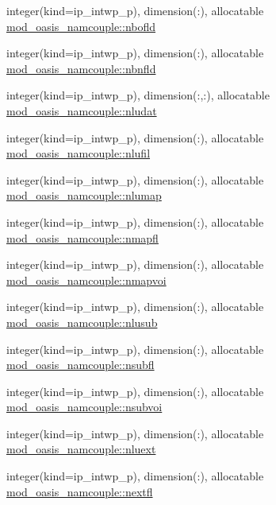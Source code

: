 \begin{DoxyCompactItemize}
\item 
integer(kind=ip\+\_\+intwp\+\_\+p), dimension(\+:), allocatable \hyperlink{namespacemod__oasis__namcouple_a21400200658d24cbf7484b5eb177c911}{mod\+\_\+oasis\+\_\+namcouple\+::nbofld}
\item 
integer(kind=ip\+\_\+intwp\+\_\+p), dimension(\+:), allocatable \hyperlink{namespacemod__oasis__namcouple_af0c7b1e7e49159c6b9c0dc3663264346}{mod\+\_\+oasis\+\_\+namcouple\+::nbnfld}
\item 
integer(kind=ip\+\_\+intwp\+\_\+p), dimension(\+:,\+:), allocatable \hyperlink{namespacemod__oasis__namcouple_abb7c2cd3a371bbb8ccd6a272d0e9b60f}{mod\+\_\+oasis\+\_\+namcouple\+::nludat}
\item 
integer(kind=ip\+\_\+intwp\+\_\+p), dimension(\+:), allocatable \hyperlink{namespacemod__oasis__namcouple_a31f62f64cbcf344e529d0576386d0751}{mod\+\_\+oasis\+\_\+namcouple\+::nlufil}
\item 
integer(kind=ip\+\_\+intwp\+\_\+p), dimension(\+:), allocatable \hyperlink{namespacemod__oasis__namcouple_a42367b4984c6ac4c69cbdcd315cb54e6}{mod\+\_\+oasis\+\_\+namcouple\+::nlumap}
\item 
integer(kind=ip\+\_\+intwp\+\_\+p), dimension(\+:), allocatable \hyperlink{namespacemod__oasis__namcouple_ac623e3e0906f57983efc1ab912ce9674}{mod\+\_\+oasis\+\_\+namcouple\+::nmapfl}
\item 
integer(kind=ip\+\_\+intwp\+\_\+p), dimension(\+:), allocatable \hyperlink{namespacemod__oasis__namcouple_adb1f8ce6bf94f488c10ef36b3afb8eca}{mod\+\_\+oasis\+\_\+namcouple\+::nmapvoi}
\item 
integer(kind=ip\+\_\+intwp\+\_\+p), dimension(\+:), allocatable \hyperlink{namespacemod__oasis__namcouple_aefed5eaa9924d249e979a5a772a46979}{mod\+\_\+oasis\+\_\+namcouple\+::nlusub}
\item 
integer(kind=ip\+\_\+intwp\+\_\+p), dimension(\+:), allocatable \hyperlink{namespacemod__oasis__namcouple_a6a94577996b440c31cac5b7d39e7f47a}{mod\+\_\+oasis\+\_\+namcouple\+::nsubfl}
\item 
integer(kind=ip\+\_\+intwp\+\_\+p), dimension(\+:), allocatable \hyperlink{namespacemod__oasis__namcouple_a0f31605257bfe125aafb6488a5065d4d}{mod\+\_\+oasis\+\_\+namcouple\+::nsubvoi}
\item 
integer(kind=ip\+\_\+intwp\+\_\+p), dimension(\+:), allocatable \hyperlink{namespacemod__oasis__namcouple_a7510ecfe3d0f141252450e4ba66209ba}{mod\+\_\+oasis\+\_\+namcouple\+::nluext}
\item 
integer(kind=ip\+\_\+intwp\+\_\+p), dimension(\+:), allocatable \hyperlink{namespacemod__oasis__namcouple_a8302411d5a02efd9a6dc7f784fbb0d4d}{mod\+\_\+oasis\+\_\+namcouple\+::nextfl}

\end{DoxyCompactItemize}
